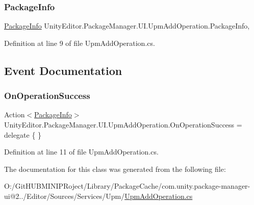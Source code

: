 \subsubsection{\texorpdfstring{PackageInfo}{PackageInfo}}
{\footnotesize\ttfamily \mbox{\hyperlink{class_unity_editor_1_1_package_manager_1_1_u_i_1_1_package_info}{Package\+Info}} Unity\+Editor.\+Package\+Manager.\+U\+I.\+Upm\+Add\+Operation.\+Package\+Info\hspace{0.3cm}{\ttfamily [get]}, {}}



Definition at line 9 of file Upm\+Add\+Operation.\+cs.



\subsection{Event Documentation}
\mbox{\label{class_unity_editor_1_1_package_manager_1_1_u_i_1_1_upm_add_operation_a291a66dd365a5e5afc3ab716b8e94288}} 
\subsubsection{\texorpdfstring{OnOperationSuccess}{OnOperationSuccess}}
{\footnotesize\ttfamily Action$<$\mbox{\hyperlink{class_unity_editor_1_1_package_manager_1_1_u_i_1_1_package_info}{Package\+Info}}$>$ Unity\+Editor.\+Package\+Manager.\+U\+I.\+Upm\+Add\+Operation.\+On\+Operation\+Success = delegate \{ \}}



Definition at line 11 of file Upm\+Add\+Operation.\+cs.



The documentation for this class was generated from the following file\+:\begin{DoxyCompactItemize}
\item 
O\+:/\+Git\+H\+U\+B\+M\+I\+N\+I\+P\+Roject/\+Library/\+Package\+Cache/com.\+unity.\+package-\/manager-\/ui@2../\+Editor/\+Sources/\+Services/\+Upm/\mbox{\hyperlink{_upm_add_operation_8cs}{Upm\+Add\+Operation.\+cs}}\end{DoxyCompactItemize}
